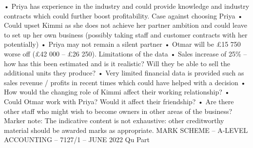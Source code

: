\documentclass{article}
\begin{document}
• Priya has experience in the industry and could provide knowledge and industry contracts which could \newline
further boost profitability. \newline
  \newline
Case against choosing Priya \newline
 \newline
• Could upset Kimmi as she does not achieve her partner ambition and could leave to set up her own \newline
business (possibly taking staff and customer contracts with her potentially) \newline
• Priya may not remain a silent partner \newline
• Otmar will be £15 750 worse off (£42 000 – £26 250). \newline
 \newline
Limitations of the data \newline
• Sales increase of 25\% – how has this been estimated and is it realistic?  Will they be able to sell the \newline
additional units they produce? \newline
• Very limited financial data is provided such as sales revenue / profits in recent times which could have \newline
helped with a decision \newline
• How would the changing role of Kimmi affect their working relationship? \newline
• Could Otmar work with Priya?  Would it affect their friendship? \newline
• Are there other staff who might wish to become owners in other areas of the business? \newline
 \newline
Marker note: \newline
 \newline
The indicative content is not exhaustive: other creditworthy material should be awarded marks as \newline
appropriate. \newline
 \newline
 \newline
 \newline
MARK SCHEME – A-LEVEL ACCOUNTING – 7127/1 – JUNE 2022  \newline
Qu \newline
Part \newline
\end{document}
